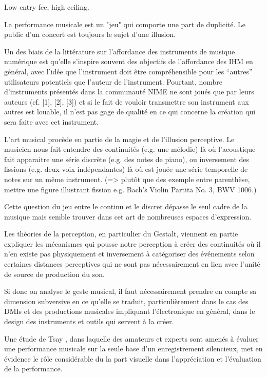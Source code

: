 Low entry fee, high ceiling.

La performance musicale est un "jeu" qui comporte une part de duplicité. Le public d'un concert est toujours le sujet d'une illusion. 

Un des biais de la littérature sur l’affordance des instruments de musique numérique est qu’elle s’inspire souvent des objectifs de l’affordance des IHM en général, avec l’idée que l’instrument doit être compréhensible pour les “autres” utilisateurs potentiels que l’auteur de l’instrument. Pourtant, nombre d’instruments présentés dans la communauté NIME ne sont joués que par leurs auteurs (cf. [1], [2], [3]) et si le fait de vouloir transmettre son instrument aux autres est louable, il n’est pas gage de qualité en ce qui concerne la création qui sera faite avec cet instrument. 


L'art musical procède en partie de la magie et de l'illusion perceptive. Le musicien nous fait entendre des continuités (e.g. une mélodie) là où l'acoustique fait apparaitre une série discrète (e.g. des notes de piano), ou inversement des fissions (e.g. deux voix indépendantes) là où est jouée une série temporelle de notes sur un même instrument. (=> plutôt que des exemple entre parenthèse, mettre une figure illustrant fission e.g. Bach's Violin Partita No. 3, BWV 1006.)

Cette question du jeu entre le continu et le discret dépasse le seul cadre de la musique mais semble trouver dans cet art de nombreuses espaces d'expression.

Les théories de la perception, en particulier du Gestalt, viennent en partie expliquer les mécanismes qui pousse notre perception à créer des continuités où il n'en existe pas physiquement et inversement à catégoriser des événements selon certaines distances perceptives qui ne sont pas nécessairement en lien avec l'unité de source de production du son.

Si donc on analyse le geste musical, il faut nécessairement prendre en compte sa dimension subversive en ce qu'elle se traduit, particulièrement dans le cas des DMIs et des productions musicales impliquant l'électronique en général, dans le design des instruments et outils qui servent à la créer.

\cite{bin_show_2018}

Une étude de Tsay \cite{tsay_sight_2013}, dans laquelle des amateurs et experts sont amenés à évaluer une performance musicale sur la seule base d'un enregistrement silencieux, met en évidence le rôle considérable du la part visuelle dans l'appréciation et l'évaluation de la performance.

